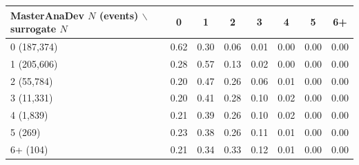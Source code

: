\begin{tabular}{lccccccc}
\toprule
MasterAnaDev $N$ (events) $\backslash$ surrogate $N$ & 0 & 1 & 2 & 3 & 4 & 5 & 6+ \\
\midrule
0 (187,374) & 0.62 & 0.30 & 0.06 & 0.01 & 0.00 & 0.00 & 0.00 \\
1 (205,606) & 0.28 & 0.57 & 0.13 & 0.02 & 0.00 & 0.00 & 0.00 \\
2 (55,784) & 0.20 & 0.47 & 0.26 & 0.06 & 0.01 & 0.00 & 0.00 \\
3 (11,331) & 0.20 & 0.41 & 0.28 & 0.10 & 0.02 & 0.00 & 0.00 \\
4 (1,839) & 0.21 & 0.39 & 0.26 & 0.10 & 0.02 & 0.00 & 0.00 \\
5 (269) & 0.23 & 0.38 & 0.26 & 0.11 & 0.01 & 0.00 & 0.00 \\
6+ (104) & 0.21 & 0.34 & 0.33 & 0.12 & 0.01 & 0.00 & 0.00 \\
\bottomrule
\end{tabular}
